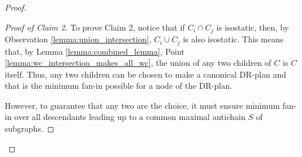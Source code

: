 \begin{proof}
\begin{proof}[Proof of Claim 2]
        To prove Claim 2, notice that if $C_i\cap C_j$ is isostatic, then, by Observation \ref{lemma:union_intersection}, $C_i\cup C_j$ is also isostatic. This means that, by Lemma \ref{lemma:combined_lemma}, Point \ref{lemma:wc_intersection_makes_all_wc}, the union of any two children of $C$ is $C$ itself. Thus, any two children can be chosen to make a canonical DR-plan and that is the minimum fan-in possible for a node of the DR-plan.

        \newcommand{\induceonc}[1]{Idc\left(C,#1\right)}
        \renewcommand{\induceonc}[1]{#1}
        \newcommand{\iunion}[1]{\induceonc{I\cup\bigcup_{k\in [N]\setminus\{#1\}}{R_k}}}

        However, to guarantee that any two are the  choice, it must ensure minimum fan-in over all descendants leading up to a common maximal antichain $S$ of subgraphs.


\end{proof}
\end{proof}
